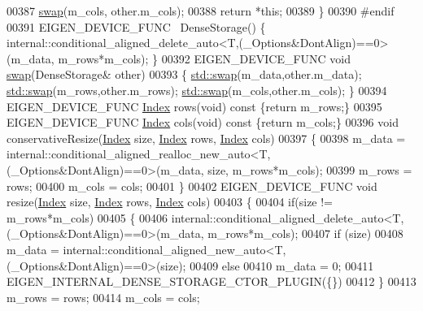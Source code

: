 \begin{DoxyCode}
00387       \hyperlink{endian_8c_a3ca5ecd34b04d6a243c054ac3a57f68d}{swap}(m\_cols, other.m\_cols);
00388       \textcolor{keywordflow}{return} *\textcolor{keyword}{this};
00389     \}
00390 \textcolor{preprocessor}{#endif}
00391     EIGEN\_DEVICE\_FUNC ~DenseStorage() \{ 
      internal::conditional\_aligned\_delete\_auto<T,(\_Options&DontAlign)==0>(m\_data, m\_rows*m\_cols); \}
00392     EIGEN\_DEVICE\_FUNC \textcolor{keywordtype}{void} \hyperlink{endian_8c_a3ca5ecd34b04d6a243c054ac3a57f68d}{swap}(DenseStorage& other)
00393     \{ \hyperlink{endian_8c_a3ca5ecd34b04d6a243c054ac3a57f68d}{std::swap}(m\_data,other.m\_data); \hyperlink{endian_8c_a3ca5ecd34b04d6a243c054ac3a57f68d}{std::swap}(m\_rows,other.m\_rows); 
      \hyperlink{endian_8c_a3ca5ecd34b04d6a243c054ac3a57f68d}{std::swap}(m\_cols,other.m\_cols); \}
00394     EIGEN\_DEVICE\_FUNC \hyperlink{namespace_eigen_a62e77e0933482dafde8fe197d9a2cfde}{Index} rows(\textcolor{keywordtype}{void})\textcolor{keyword}{ const }\{\textcolor{keywordflow}{return} m\_rows;\}
00395     EIGEN\_DEVICE\_FUNC \hyperlink{namespace_eigen_a62e77e0933482dafde8fe197d9a2cfde}{Index} cols(\textcolor{keywordtype}{void})\textcolor{keyword}{ const }\{\textcolor{keywordflow}{return} m\_cols;\}
00396     \textcolor{keywordtype}{void} conservativeResize(\hyperlink{namespace_eigen_a62e77e0933482dafde8fe197d9a2cfde}{Index} size, \hyperlink{namespace_eigen_a62e77e0933482dafde8fe197d9a2cfde}{Index} rows, \hyperlink{namespace_eigen_a62e77e0933482dafde8fe197d9a2cfde}{Index} cols)
00397     \{
00398       m\_data = internal::conditional\_aligned\_realloc\_new\_auto<T,(\_Options&DontAlign)==0>(m\_data, size, 
      m\_rows*m\_cols);
00399       m\_rows = rows;
00400       m\_cols = cols;
00401     \}
00402     EIGEN\_DEVICE\_FUNC \textcolor{keywordtype}{void} resize(\hyperlink{namespace_eigen_a62e77e0933482dafde8fe197d9a2cfde}{Index} size, \hyperlink{namespace_eigen_a62e77e0933482dafde8fe197d9a2cfde}{Index} rows, \hyperlink{namespace_eigen_a62e77e0933482dafde8fe197d9a2cfde}{Index} cols)
00403     \{
00404       \textcolor{keywordflow}{if}(size != m\_rows*m\_cols)
00405       \{
00406         internal::conditional\_aligned\_delete\_auto<T,(\_Options&DontAlign)==0>(m\_data, m\_rows*m\_cols);
00407         \textcolor{keywordflow}{if} (size)
00408           m\_data = internal::conditional\_aligned\_new\_auto<T,(\_Options&DontAlign)==0>(size);
00409         \textcolor{keywordflow}{else}
00410           m\_data = 0;
00411         EIGEN\_INTERNAL\_DENSE\_STORAGE\_CTOR\_PLUGIN(\{\})
00412       \}
00413       m\_rows = rows;
00414       m\_cols = cols;

\end{DoxyCode}
